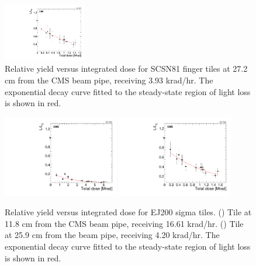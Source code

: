 \begin{figure}[tbp!]
\includegraphics[width=0.32\textwidth]{figures/SCSN81-F-27p2cm-f16ch0-dose.pdf}
\caption{Relative yield versus integrated dose for SCSN81 finger tiles at 27.2 cm from the CMS beam pipe, receiving 3.93 krad/hr. The exponential decay curve fitted to the steady-state region of light loss is shown in red.}
\label{fig:SCSN81-F-27p2cm-dose}
\end{figure} 

\begin{figure}[tbp!]
\centering
\includegraphics[width=0.45\textwidth]{figures/EJ200-S-11p8cm-f18ch5-dose.pdf}
\includegraphics[width=0.45\textwidth]{figures/EJ200-S-25p9cm-f15ch5-dose.pdf}
\caption{Relative yield versus integrated dose for EJ200 sigma tiles. (\cmsLeft) Tile at 11.8 cm from the CMS beam pipe, receiving 16.61 krad/hr. (\cmsRight) Tile at 25.9 cm from the beam pipe, receiving 4.20 krad/hr. The exponential decay curve fitted to the steady-state region of light loss is shown in red.}
\label{fig:EJ200-S-dose}
\end{figure} 

